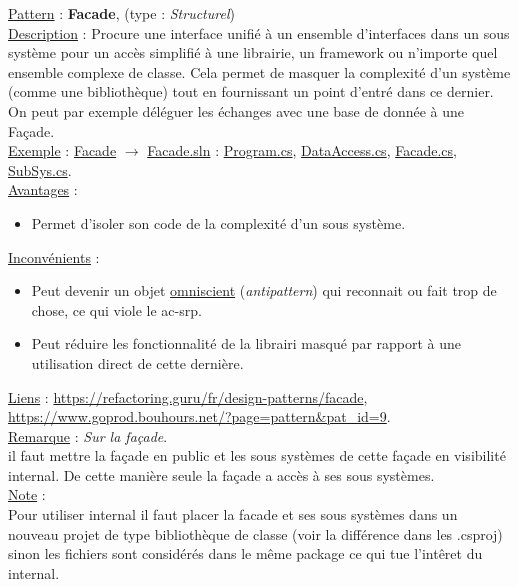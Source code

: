 \documentclass[a4paper,12pt,twoside]{article}
\newcommand{\exemplepath}{../Exercices}
\newcommand{\urlcolor}{magenta}  %
\newcommand{\foldercolor}{orange} %
\newcommand{\cscolor}{green!60!black} %
\newcommand{\slncolor}{violet} %
\newcommand{\incode}[1]{{\footnotesize\ttfamily #1}} %
\newcommand{\rem}[2]{\noindent\underline{Remarque} : \textit{#1}.\\ \indent #2}
\newcommand{\note}[1]{\noindent\underline{Note} : \\ \indent #1}
\newcommand{\csref}[2]{\hypersetup{urlcolor=\cscolor}\href{file:\exemplepath /#1.cs}{#2.cs}\hypersetup{urlcolor=\urlcolor}}
\newcommand{\slnref}[2]{\hypersetup{urlcolor=\slncolor}\href{file:\exemplepath /#1.sln}{#2.sln}\hypersetup{urlcolor=\urlcolor}}
\newcommand{\folderref}[2]{\hypersetup{urlcolor=\foldercolor}\href{file:\exemplepath /#1/.}{#2}\hypersetup{urlcolor=\urlcolor}}
\newcommand{\dpat}[7]{
\noindent \underline{Pattern} : \textbf{#1}, \indent (type : \textit{#2}) \\
\underline{Description} : \indent #3 \\
\underline{Exemple} : \indent #4 \\
\noindent \underline{Avantages} : 
\begin{itemize}
 #5
\end{itemize}
\noindent \underline{Inconvénients} : 
\begin{itemize}
 #6 
\end{itemize}
\underline{Liens} : #7 
}
\begin{document}
\dpat{Facade}
{Structurel}
{Procure une interface unifié à un ensemble d'interfaces dans un sous système pour un accès simplifié à une librairie, un framework ou n'importe quel ensemble complexe de classe. Cela permet de masquer la complexité d'un système (comme une bibliothèque) tout en fournissant un point d'entré dans ce dernier. On peut par exemple déléguer les échanges avec une base de donnée à une Façade.}
{\folderref{Facade}{Facade} $\to$ \slnref{Facade/Facade}{Facade} : \indent \csref{Facade/Facade/Program}{Program}, \csref{Facade/MonPackage/DataAccess}{DataAccess}, \csref{Facade/MonPackage/Facade}{Facade}, \csref{Facade/MonPackage/Subsys}{SubSys}.}
{\item Permet d'isoler son code de la complexité d'un sous système.} 
{\item Peut devenir un objet \href{https://fr.wikipedia.org/wiki/God_object}{omniscient} (\textit{antipattern}) qui reconnait ou fait trop de chose, ce qui viole le \gls{ac-srp}.
\item Peut réduire les fonctionnalité de la librairi masqué par rapport à une utilisation direct de cette dernière.}
{\url{https://refactoring.guru/fr/design-patterns/facade}, \\ \url{https://www.goprod.bouhours.net/?page=pattern&pat_id=9}.}\\

\rem{Sur la façade}{il faut mettre la façade en \incode{public} et les sous systèmes de cette façade en visibilité \incode{internal}. De cette manière seule la façade a accès à ses sous systèmes.}\\

\note{Pour utiliser \incode{internal} il faut placer la facade et ses sous systèmes dans un nouveau projet de type bibliothèque de classe (voir la différence dans les .csproj) sinon les fichiers sont considérés dans le même package ce qui tue l'intêret du \incode{internal}.}\\
\end{document}
